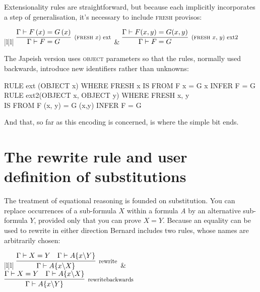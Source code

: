 Extensionality rules are straightforward, but because each implicitly incorporates a step of generalisation, it's necessary to include \textsc{fresh} provisos:

\begin{ruletab}{|l|l|}
\hline
$\infer[\reason{(\textsc{fresh} $x$) ext}]
       {\Gamma  |- F=G}
       {\Gamma  |- F\left( x\right) =G\left( x\right) }$
 & 
$\infer[\reason{(\textsc{fresh} $x$, $y$) ext2}]
       {\Gamma  |- F=G}
       {\Gamma  |- F(x,y)=G(x,y)}$
\\
\hline
\end{ruletab}

The Japeish version uses \textsc{object} parameters so that the rules, normally used backwards, introduce new identifiers rather than unknowns:
\begin{japeish}
RULE ext (OBJECT x) WHERE FRESH x IS FROM  F x = G x INFER F = G\\
RULE ext2(OBJECT x, OBJECT y)  WHERE FRESH x, y\\
 IS FROM  F (x, y) = G (x,y)  INFER F = G
\end{japeish}
And that, so far as this encoding is concerned, is where the simple bit ends.

\section{The rewrite rule and user definition of substitutions}

The treatment of equational reasoning is founded on substitution. You can replace occurrences of a sub-formula $X$ within a formula \textit{A} by an alternative sub-formula $Y$, provided only that you can prove $X=Y$. Because an equality can be used to rewrite in either direction Bernard includes two rules, whose names are arbitrarily chosen:

\begin{ruletab}{|l|l|} 
\hline
$\infer[\reason{rewrite}]
	{\Gamma|-A\{x\backslash X\}}
	{\Gamma|-X=Y & \Gamma|-A\{x\backslash Y\}}$
&
$\infer[\reason{rewritebackwards}]
	{\Gamma |-A\{x\backslash Y\}}
	{\Gamma |-X=Y & \Gamma|- A\{x\backslash X\}}$
\\
\hline
\end{ruletab}

